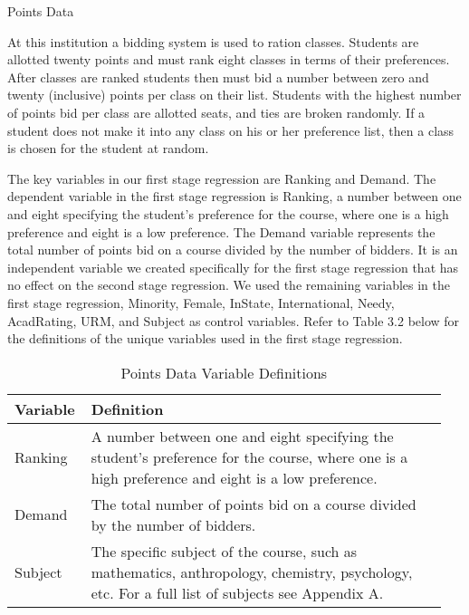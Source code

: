 \documentclass[12pt,a4paper,english,fleqn]{article}
\makeatletter
\renewcommand\subsection{\@startsection{subsection}{2}
{\z@}{-3.25ex\@plus -1ex \@minus -.2ex}{1.5ex \@plus .2ex}{\normalfont\bf}}
\makeatother
\begin{document}
\clearpage{}

\subsection{Points Data}

At this institution a bidding system is used to ration classes. 
Students are allotted twenty points and must rank eight classes in terms of their preferences. 
After classes are ranked students then must bid a number between zero and twenty (inclusive) points per class on their list. 
Students with the highest number of points bid per class are allotted seats, and ties are broken randomly. 
If a student does not make it into any class on his or her preference list, then a class is chosen for the student at random. 

The key variables in our first stage regression are Ranking and Demand. 
The dependent variable in the first stage regression is Ranking, a number between one and eight specifying the student's preference for the course, where one is a high preference and eight is a low preference. 
The Demand variable represents the total number of points bid on a course divided by the number of bidders. 
It is an independent variable we created specifically for the first stage regression that has no effect on the second stage regression. 
We used the remaining variables in the first stage regression, Minority, Female, InState, International, Needy, AcadRating, URM, and Subject as control variables. Refer to Table 3.2 below for the definitions of the unique variables used in the first stage regression. 

\clearpage{}

\begin{table}[htb]
  \centering
  \caption{Points Data Variable Definitions}
  \begin{tabular}{||p{0.15\linewidth}|p{0.8\linewidth}||} 
    \hline
    Variable & Definition \\ [0.5ex] 
    \hline\hline
    Ranking & A number between one and eight specifying the student's preference for the course, where one is a high preference and eight is a low preference. \\ 
    \hline
    Demand & The total number of points bid on a course divided by the number of bidders. \\
    \hline
    Subject & The specific subject of the course, such as mathematics, anthropology, chemistry, psychology, etc. For a full list of subjects see Appendix A. \\
    [1ex] 
    \hline
  \end{tabular}
\end{table}
\end{document}
